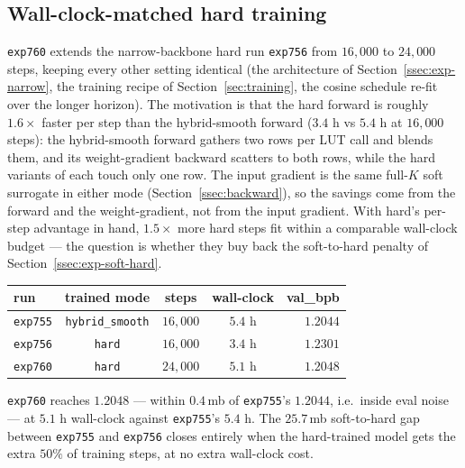 \documentclass[11pt]{article}
\begin{document}
\subsection{Wall-clock-matched hard training}
\label{ssec:exp-wallclock}

\texttt{exp760} extends the narrow-backbone hard run \texttt{exp756} from $16{,}000$ to $24{,}000$ steps, keeping every other setting identical (the architecture of Section~\ref{ssec:exp-narrow}, the training recipe of Section~\ref{sec:training}, the cosine schedule re-fit over the longer horizon). The motivation is that the hard forward is roughly $1.6\times$ faster per step than the hybrid-smooth forward ($3.4$ h vs $5.4$ h at $16{,}000$ steps): the hybrid-smooth forward gathers two rows per LUT call and blends them, and its weight-gradient backward scatters to both rows, while the hard variants of each touch only one row. The input gradient is the same full-$K$ soft surrogate in either mode (Section~\ref{ssec:backward}), so the savings come from the forward and the weight-gradient, not from the input gradient. With hard's per-step advantage in hand, $1.5\times$ more hard steps fit within a comparable wall-clock budget --- the question is whether they buy back the soft-to-hard penalty of Section~\ref{ssec:exp-soft-hard}.

\begin{center}
\begin{tabular}{lcccr}
\toprule
\textbf{run} & \textbf{trained mode} & \textbf{steps} & \textbf{wall-clock} & \textbf{val\_bpb} \\
\midrule
\texttt{exp755} & \texttt{hybrid\_smooth} & $16{,}000$ & $5.4$ h & $1.2044$ \\
\texttt{exp756} & \texttt{hard}           & $16{,}000$ & $3.4$ h & $1.2301$ \\
\texttt{exp760} & \texttt{hard}           & $24{,}000$ & $5.1$ h & $\mathbf{1.2048}$ \\
\bottomrule
\end{tabular}
\end{center}

\texttt{exp760} reaches $1.2048$ --- within $0.4$\,mb of \texttt{exp755}'s $1.2044$, i.e.\ inside eval noise --- at $5.1$ h wall-clock against \texttt{exp755}'s $5.4$ h. The $25.7$\,mb soft-to-hard gap between \texttt{exp755} and \texttt{exp756} closes entirely when the hard-trained model gets the extra $50\%$ of training steps, at no extra wall-clock cost.
\end{document}

